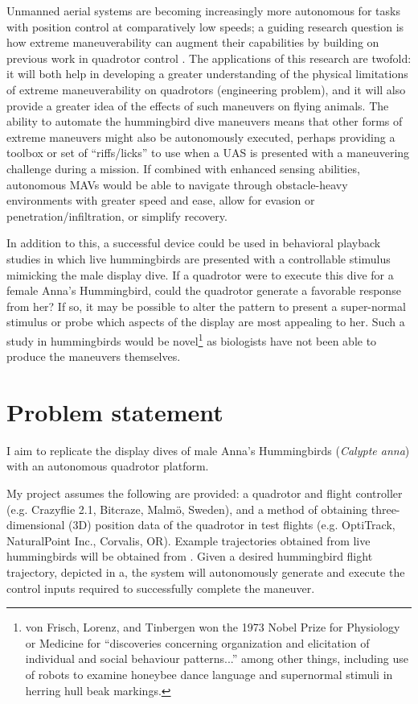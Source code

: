 \documentclass[onecolumn,10pt]{IEEEtran}
\newcommand{\Calypteanna}{\emph{Calypte anna}}
\begin{document}
Unmanned aerial systems are becoming increasingly more autonomous for tasks with position control at comparatively low speeds; a guiding research question is how extreme maneuverability can augment their capabilities by building on previous work in quadrotor control  \cite{mellinger2011minimum, greiff2017modelling}.  The applications of this research are twofold: it will both help in developing a greater understanding of the physical limitations of extreme maneuverability on quadrotors (engineering problem), and it will also provide a greater idea of the effects of such maneuvers on flying animals. The ability to automate the hummingbird dive maneuvers means that other forms of extreme maneuvers might also be autonomously executed, perhaps providing a toolbox or set of ``riffs/licks'' to use when a UAS is presented with a maneuvering challenge during a mission.  If combined with enhanced sensing abilities, autonomous MAVs would be able to navigate through obstacle-heavy environments with greater speed and ease, allow for evasion or penetration/infiltration, or simplify recovery. 

In addition to this, a successful device could be used in behavioral playback studies in which live hummingbirds are presented with a controllable stimulus mimicking the male display dive.  If a quadrotor were to execute this dive for a female Anna's Hummingbird, could the quadrotor generate a favorable response from her? If so, it may be possible to alter the pattern to present a super-normal stimulus or probe which aspects of the display are most appealing to her.  Such a study in hummingbirds would be novel\footnote{von Frisch, Lorenz, and Tinbergen won the 1973 Nobel Prize for Physiology or Medicine for ``discoveries concerning organization and elicitation of individual and social behaviour patterns...'' among other things, including use of robots to examine honeybee dance language and supernormal stimuli in herring hull beak markings.}  as biologists have not been able to produce the maneuvers themselves.






\section{Problem statement}
I aim to replicate the display dives of male Anna’s Hummingbirds (\Calypteanna) with an autonomous quadrotor platform. 

My project assumes the following are provided: a quadrotor and  flight controller (e.g. Crazyflie 2.1, Bitcraze, Malm\"{o}, Sweden), and a method of obtaining three-dimensional (3D) position data of the quadrotor in test flights (e.g. OptiTrack, NaturalPoint Inc., Corvalis, OR). Example trajectories obtained from live hummingbirds will be obtained from \cite{clark2009courtship}.  Given a desired hummingbird flight trajectory, depicted in a, the system will autonomously generate and execute the control inputs required to successfully complete the maneuver. 
\end{document}
